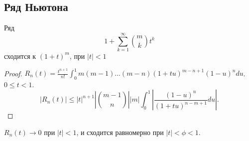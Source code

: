 \documentclass[11pt]{book}
\renewcommand{\le}{\leqslant}
\theoremstyle{definition}
\theoremstyle{plain}
\theoremstyle{plain}
\theoremstyle{definition}
\theoremstyle{remark}
\begin{document}
\subsection{Ряд Ньютона}
\begin{thm}
    Ряд
    \[
	1 + \sum_{k=1}^{\infty} {m \choose k} t ^{k}
    \]
    сходится к $ (1+t)^{m}$, при $ |t|<1$
\end{thm}
\begin{proof}
    $ R_n(t) = \frac{t ^{n+1}}{n!} \int_0^{1} m (m-1) \ldots  (m-n) (1 + tu) ^{m-n+1} (1-u)^{n} du$.  $ 0 \le  t< 1$.
    \[
	|R_n(t) | \le  |t|^{n+1} \left| {m-1 \choose n} \right| |m| \int_0 ^{1} \left|\frac{(1-u)^{n}}{(1+tu)^{n-m+1}} du \right|
    .\]
\end{proof}
\begin{thm}
    $ R_n (t) \to 0$  при $ |t|<1$, и  сходится равномерно при $ |t| < \phi < 1$.
\end{thm}
\end{document}
